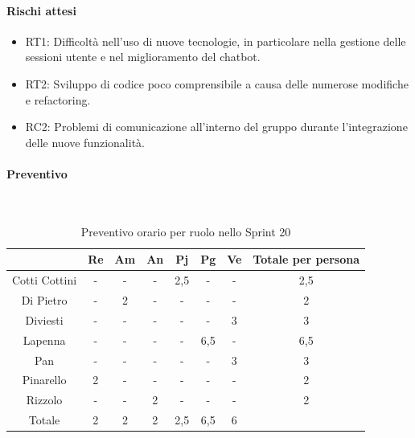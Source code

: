 \documentclass{article}
\begin{document}
            \paragraph{Rischi attesi}
            \begin{itemize}
                \item RT1: Difficoltà nell’uso di nuove tecnologie, in particolare nella gestione delle sessioni utente e nel miglioramento del chatbot.
                \item RT2: Sviluppo di codice poco comprensibile a causa delle numerose modifiche e refactoring.
                \item RC2: Problemi di comunicazione all’interno del gruppo durante l'integrazione delle nuove funzionalità.
            \end{itemize}

            \paragraph{Preventivo}\mbox{}\\
            \begin{table}[H]
                \centering
                \begin{tabular}{|c|c|c|c|c|c|c|c|}
                \hline
                              & Re  & Am  & An  & Pj  & Pg  & Ve  & Totale per persona \\ \hline
                Cotti Cottini & -   & -   & -   & 2,5 & -   & -   & 2,5                \\ \hline
                Di Pietro     & -   & 2   & -   & -   & -   & -   & 2                  \\ \hline
                Diviesti      & -   & -   & -   & -   & -   & 3   & 3                  \\ \hline
                Lapenna       & -   & -   & -   & -   & 6,5 & -   & 6,5                \\ \hline
                Pan           & -   & -   & -   & -   & -   & 3   & 3                  \\ \hline
                Pinarello     & 2   & -   & -   & -   & -   & -   & 2                  \\ \hline
                Rizzolo       & -   & -   & 2   & -   & -   & -   & 2                  \\ \hline
                Totale        & 2   & 2   & 2   & 2,5 & 6,5 & 6   &                    \\ \hline
                \end{tabular}
                \caption{Preventivo orario per ruolo nello Sprint 20}
            \end{table}
\end{document}
